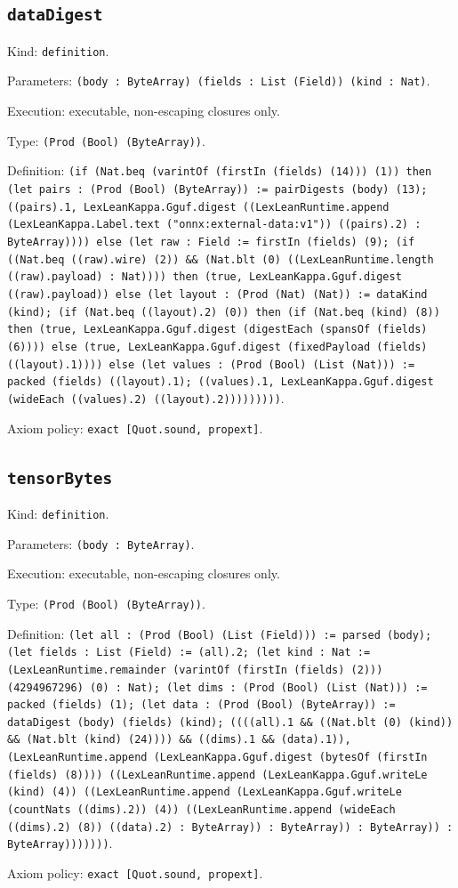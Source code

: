 \documentclass[11pt]{article}
\begin{document}
\subsection*{\texttt{dataDigest}}
\noindent Kind: \texttt{definition}.\par
\noindent Parameters: \texttt{(body : ByteArray) (fields : List (Field)) (kind : Nat)}.\par
\noindent Execution: executable, non-escaping closures only.\par
\noindent Type: \texttt{(Prod (Bool) (ByteArray))}.\par
\noindent Definition: \texttt{(if (Nat.beq (varintOf (firstIn (fields) (14))) (1)) then (let pairs : (Prod (Bool) (ByteArray)) := pairDigests (body) (13); ((pairs).1, LexLeanKappa.Gguf.digest ((LexLeanRuntime.append (LexLeanKappa.Label.text ("onnx:external-data:v1")) ((pairs).2) : ByteArray)))) else (let raw : Field := firstIn (fields) (9); (if ((Nat.beq ((raw).wire) (2)) \&\& (Nat.blt (0) ((LexLeanRuntime.length ((raw).payload) : Nat)))) then (true, LexLeanKappa.Gguf.digest ((raw).payload)) else (let layout : (Prod (Nat) (Nat)) := dataKind (kind); (if (Nat.beq ((layout).2) (0)) then (if (Nat.beq (kind) (8)) then (true, LexLeanKappa.Gguf.digest (digestEach (spansOf (fields) (6)))) else (true, LexLeanKappa.Gguf.digest (fixedPayload (fields) ((layout).1)))) else (let values : (Prod (Bool) (List (Nat))) := packed (fields) ((layout).1); ((values).1, LexLeanKappa.Gguf.digest (wideEach ((values).2) ((layout).2)))))))))}.\par
\noindent Axiom policy: \texttt{exact [Quot.sound, propext]}.\par
\subsection*{\texttt{tensorBytes}}
\noindent Kind: \texttt{definition}.\par
\noindent Parameters: \texttt{(body : ByteArray)}.\par
\noindent Execution: executable, non-escaping closures only.\par
\noindent Type: \texttt{(Prod (Bool) (ByteArray))}.\par
\noindent Definition: \texttt{(let all : (Prod (Bool) (List (Field))) := parsed (body); (let fields : List (Field) := (all).2; (let kind : Nat := (LexLeanRuntime.remainder (varintOf (firstIn (fields) (2))) (4294967296) (0) : Nat); (let dims : (Prod (Bool) (List (Nat))) := packed (fields) (1); (let data : (Prod (Bool) (ByteArray)) := dataDigest (body) (fields) (kind); ((((all).1 \&\& ((Nat.blt (0) (kind)) \&\& (Nat.blt (kind) (24)))) \&\& ((dims).1 \&\& (data).1)), (LexLeanRuntime.append (LexLeanKappa.Gguf.digest (bytesOf (firstIn (fields) (8)))) ((LexLeanRuntime.append (LexLeanKappa.Gguf.writeLe (kind) (4)) ((LexLeanRuntime.append (LexLeanKappa.Gguf.writeLe (countNats ((dims).2)) (4)) ((LexLeanRuntime.append (wideEach ((dims).2) (8)) ((data).2) : ByteArray)) : ByteArray)) : ByteArray)) : ByteArray)))))))}.\par
\noindent Axiom policy: \texttt{exact [Quot.sound, propext]}.\par
\end{document}
